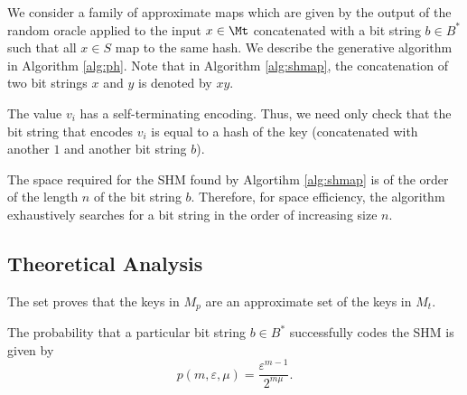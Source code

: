 \documentclass[
  letterpaper,
  DIV=11,
  numbers=noendperiod]{scrartcl}
\theoremstyle{remark}
\begin{document}
We consider a family of approximate maps which are given by the output
of the random oracle applied to the input \(x \in \Mt\) concatenated
with a bit string \(b \in B^*\) such that all \(x \in S\) map to the
same hash. We describe the generative algorithm in Algorithm
\ref{alg:ph}. Note that in Algorithm \ref{alg:shmap}, the concatenation
of two bit strings \(x\) and \(y\) is denoted by \(x y\).

The value \(v_i\) has a self-terminating encoding. Thus, we need only
check that the bit string that encodes \(v_i\) is equal to a hash of the
key (concatenated with another \(1\) and another bit string \(b\)).

The space required for the SHM found by Algortihm \ref{alg:shmap} is of
the order of the length \(n\) of the bit string \(b\). Therefore, for
space efficiency, the algorithm exhaustively searches for a bit string
in the order of increasing size \(n\).

\subsection{Theoretical Analysis}\label{theoretical-analysis}

The set proves that the keys in \(M_p\) are an approximate set of the
keys in \(M_t\).

The probability that a particular bit string \(b \in B^*\) successfully
codes the SHM is given by \begin{equation}
    p(m,\varepsilon,\mu) = \frac{\varepsilon^{m-1}}{2^{m \mu}}.
\end{equation}
\end{document}
